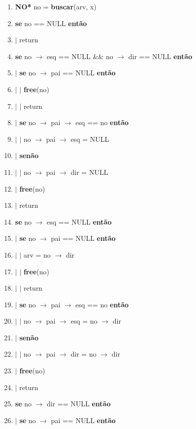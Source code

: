 \begin{itemize}
\begin{itemize}
		\begin{enumerate}[1--]
			\item \textbf{NO*} no = \textbf{buscar}(arv, x)
			\item \textbf{se} no == NULL \textbf{então}
			\item $|$ \quad return
			\item \textbf{se} no $\rightarrow$ esq == NULL \&\& no $\rightarrow$ dir == NULL \textbf{então}
			\item $|$ \quad \textbf{se} no $\rightarrow$ pai == NULL \textbf{então}
			\item $|$ \quad $|$ \quad \textbf{free}(no)
			\item $|$ \quad $|$ \quad return
			\item $|$ \quad \textbf{se} no $\rightarrow$ pai $\rightarrow$ esq == no \textbf{então}
			\item $|$ \quad $|$ \quad no $\rightarrow$ pai $\rightarrow$ esq = NULL
			\item $|$ \quad \textbf{senão}
			\item $|$ \quad $|$ \quad no $\rightarrow$ pai $\rightarrow$ dir = NULL
			\item $|$ \quad \textbf{free}(no)
			\item $|$ \quad return
			\item \textbf{se} no $\rightarrow$ esq == NULL \textbf{então}
			\item $|$ \quad \textbf{se} no $\rightarrow$ pai == NULL \textbf{então}
			\item $|$ \quad $|$ \quad arv = no $\rightarrow$ dir
			\item $|$ \quad $|$
			\quad \textbf{free}(no)
			\item $|$ \quad $|$
			\quad return
			\item $|$ \quad \textbf{se} no $\rightarrow$ pai $\rightarrow$ esq == no \textbf{então}
			\item $|$ 
			\quad $|$
			\quad no $\rightarrow$ pai $\rightarrow$ esq = no $\rightarrow$ dir
			\item $|$
			\quad \textbf{senão}
			\item $|$
			\quad $|$ \quad no $\rightarrow$ pai $\rightarrow$ dir = no $\rightarrow$ dir
			\item $|$
			\quad \textbf{free}(no)
			\item $|$
			\quad return
			\item \textbf{se} no $\rightarrow$ dir == NULL \textbf{então}
			\item $|$
			\quad \textbf{se} no $\rightarrow$ pai == NULL \textbf{então}

\end{enumerate}
\end{itemize}
\end{itemize}
